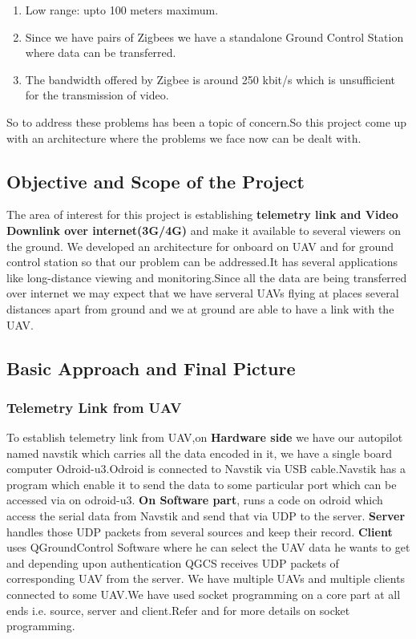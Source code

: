 \documentclass[12pt]{article}
\begin{document}
\begin{enumerate}
\item Low range: upto 100 meters maximum.
\item Since we have pairs of Zigbees we have a standalone Ground Control Station where data can be transferred.
\item The bandwidth offered by Zigbee is around 250 kbit/s which is unsufficient for the transmission of video.
\end{enumerate} 
So to address these problems has been a topic of concern.So this project come up with an architecture where the problems we face now can be dealt with.

\subsection{Objective and Scope of the Project}
The area of interest for this project is establishing {\bf telemetry link and Video Downlink over internet(3G/4G) } and make it available to several viewers on the ground.
\newline
We developed an architecture for onboard on UAV and for ground control station so that our problem can be addressed.It has several applications like long-distance viewing and monitoring.Since all the data are being transferred over internet we may expect that we have serveral UAVs flying at places several distances apart from ground and we at ground are able to have a link with the UAV.
\subsection{Basic Approach and Final Picture}
\subsubsection{Telemetry Link from UAV}
To establish telemetry link from UAV,on {\bf Hardware side} we have our autopilot named navstik which carries all the data encoded in it, we have a single board computer Odroid-u3.Odroid is connected to Navstik via USB cable.Navstik has a program which enable it to send the data to some particular port which can be accessed via on odroid-u3.
\newline 
{\bf On Software part},\newline{} runs a code on odroid which access the serial data from Navstik and send that via UDP to the server.
\newline\newline
{\bf Server} handles those UDP packets from several sources and keep their record.
\newline\newline
{\bf Client} uses QGroundControl Software where he can select the UAV data he wants to get and depending upon authentication QGCS receives UDP packets of corresponding UAV from the server.
\newline\newline
We have multiple UAVs and multiple clients connected to some UAV.We have used socket programming on a core part at all ends i.e. source, server and client.Refer \cite{1} and \cite{2} for more details on socket programming.
\newline
\end{document}
